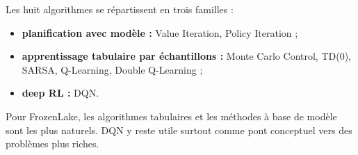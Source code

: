 \documentclass[11pt,a4paper]{article}
\begin{document}
Les huit algorithmes se répartissent en trois familles :
\begin{itemize}[leftmargin=1.6em]
    \item \textbf{planification avec modèle :} Value Iteration, Policy Iteration ;
    \item \textbf{apprentissage tabulaire par échantillons :} Monte Carlo Control, TD(0), SARSA, Q-Learning, Double Q-Learning ;
    \item \textbf{deep RL :} DQN.
\end{itemize}

Pour FrozenLake, les algorithmes tabulaires et les méthodes à base de modèle sont les plus naturels. DQN y reste utile surtout comme pont conceptuel vers des problèmes plus riches.
\end{document}
